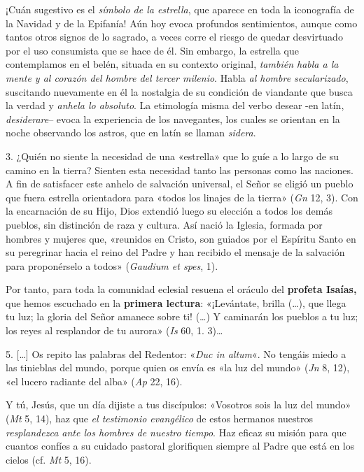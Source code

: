 \documentclass[]{article}
\begin{document}
¡Cuán sugestivo es el \emph{símbolo de la estrella}, que aparece en toda
la iconografía de la Navidad y de la Epifanía! Aún hoy evoca profundos
sentimientos, aunque como tantos otros signos de lo sagrado, a veces
corre el riesgo de quedar desvirtuado por el uso consumista que se hace
de él. Sin embargo, la estrella que contemplamos en el belén, situada en
su contexto original, \emph{también habla a la mente y al corazón del
hombre del tercer milenio}. Habla \emph{al hombre secularizado},
suscitando nuevamente en él la nostalgia de su condición de viandante
que busca la verdad y \emph{anhela lo absoluto}. La etimología misma del
verbo desear -en latín, \emph{desiderare}-- evoca la experiencia de los
navegantes, los cuales se orientan en la noche observando los astros,
que en latín se llaman \emph{sidera}.

3. ¿Quién no siente la necesidad de una «estrella» que lo guíe a lo
largo de su camino en la tierra? Sienten esta necesidad tanto las
personas como las naciones. A fin de satisfacer este anhelo de salvación
universal, el Señor se eligió un pueblo que fuera estrella orientadora
para «todos los linajes de la tierra» (\emph{Gn} 12, 3). Con la
encarnación de su Hijo, Dios extendió luego su elección a todos los
demás pueblos, sin distinción de raza y cultura. Así nació la Iglesia,
formada por hombres y mujeres que, «reunidos en Cristo, son guiados por
el Espíritu Santo en su peregrinar hacia el reino del Padre y han
recibido el mensaje de la salvación para proponérselo a todos»
(\emph{Gaudium et spes}, 1).

Por tanto, para toda la comunidad eclesial resuena el oráculo del
\textbf{profeta Isaías,} que hemos escuchado en la \textbf{primera
lectura}: «¡Levántate, brilla (\ldots{}), que llega tu luz; la gloria
del Señor amanece sobre ti! (\ldots{}) Y caminarán los pueblos a tu luz;
los reyes al resplandor de tu aurora» (\emph{Is} 60, 1. 3)\ldots{}

5. {[}\ldots{}{]} Os repito las palabras del Redentor: «\emph{Duc in
altum}«. No tengáis miedo a las tinieblas del mundo, porque quien os
envía es «la luz del mundo» (\emph{Jn} 8, 12), «el lucero radiante del
alba» (\emph{Ap} 22, 16).

Y tú, Jesús, que un día dijiste a tus discípulos: «Vosotros sois la luz
del mundo» (\emph{Mt} 5, 14), haz que \emph{el testimonio evangélico} de
estos hermanos nuestros \emph{resplandezca ante los hombres de nuestro
tiempo}. Haz eficaz su misión para que cuantos confíes a su cuidado
pastoral glorifiquen siempre al Padre que está en los cielos (cf.
\emph{Mt} 5, 16).
\end{document}
